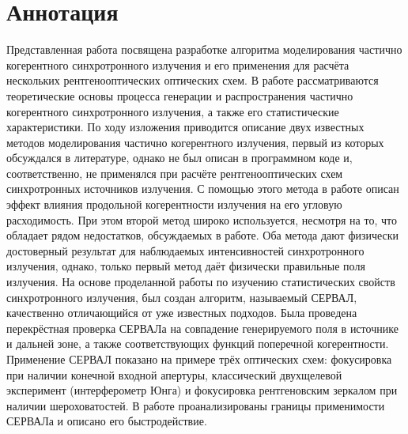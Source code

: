 \chapter*{Аннотация }							%
Представленная работа посвящена разработке алгоритма моделирования частично когерентного синхротронного излучения и его применения для расчёта нескольких рентгенооптических оптических схем. В работе рассматриваются теоретические основы процесса генерации и распространения частично когерентного синхротронного излучения, а также его статистические характеристики. По ходу изложения приводится описание двух известных методов моделирования частично когерентного излучения, первый из которых обсуждался в литературе, однако не был описан в программном коде и, соответственно, не применялся при расчёте рентгенооптических схем синхротронных источников излучения. С помощью этого метода в работе описан эффект влияния продольной когерентности излучения на его угловую расходимость. При этом второй метод широко используется, несмотря на то, что обладает рядом недостатков, обсуждаемых в работе. Оба метода дают физически достоверный результат для наблюдаемых интенсивностей синхротронного излучения, однако, только первый метод даёт физически правильные поля излучения. На основе проделанной работы по изучению статистических свойств синхротронного излучения, был создан алгоритм, называемый СЕРВАЛ, качественно отличающийся от уже известных подходов. Была проведена перекрёстная проверка СЕРВАЛа на совпадение генерируемого поля в источнике и дальней зоне, а также соответствующих функций поперечной когерентности. Применение СЕРВАЛ показано на примере трёх оптических схем: фокусировка при наличии конечной входной апертуры, классический двухщелевой эксперимент (интерферометр Юнга) и фокусировка рентгеновским зеркалом при наличии шероховатостей. В работе проанализированы границы применимости СЕРВАЛа и описано его быстродействие.
